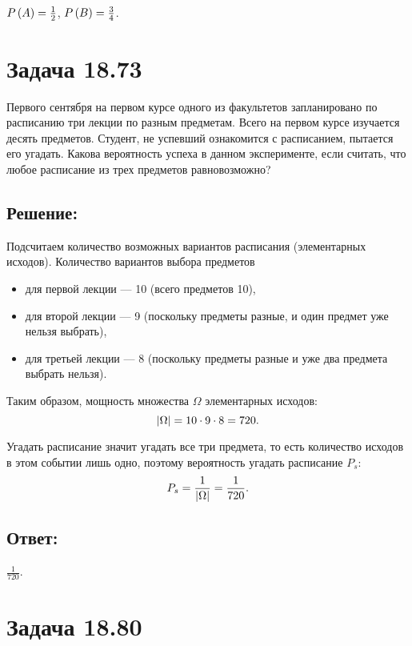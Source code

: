 $P \left ( A \right ) = \frac{1}{2}$, $P \left ( B \right ) = \frac{3}{4}$.

\section*{Задача 18.73}

Первого сентября на первом курсе одного из факультетов запланировано по расписанию три лекции по разным предметам. Всего на первом курсе изучается десять предметов. Студент,
не успевший ознакомится с расписанием, пытается его угадать. Какова вероятность успеха в данном эксперименте, если считать, что любое расписание из трех предметов равновозможно?

\subsection*{Решение:}

Подсчитаем количество возможных вариантов расписания (элементарных исходов). Количество вариантов выбора предметов
\begin{itemize}
    \item для первой лекции --- 10 (всего предметов 10),
    \item для второй лекции --- 9 (поскольку предметы разные, и один предмет уже нельзя выбрать),
    \item для третьей лекции --- 8 (поскольку предметы разные и уже два предмета выбрать нельзя).
\end{itemize}
Таким образом, мощность множества $\Omega$ элементарных исходов:
\begin{equation}
    \left | \Omega \right | = 10 \cdot 9 \cdot 8 = 720 .
\end{equation}

Угадать расписание значит угадать все три предмета, то есть количество исходов в этом событии лишь одно, поэтому вероятность угадать расписание $P_s$:
\begin{equation}
    P_s = \frac{1}{\left | \Omega \right |} = \frac{1}{720} .
\end{equation}

\subsection*{Ответ:}
$\frac{1}{720}$.

\section*{Задача 18.80}


